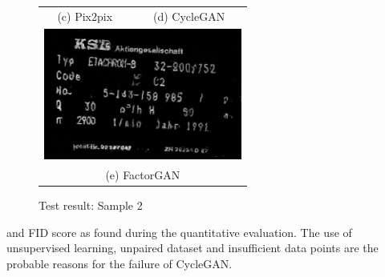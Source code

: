 \begin{figure}[H]
\begin{tabular}{cc}
(c) Pix2pix & (d) CycleGAN \\[6pt]
\multicolumn{2}{c}{\includegraphics[width=65mm]{images/f1.jpg} }\\
\multicolumn{2}{c}{(e) FactorGAN}
\end{tabular}
\caption{Test result: Sample 2}
\label{test2}
\end{figure}
\noindent
and FID score as found during the quantitative evaluation. The use of unsupervised learning, unpaired dataset and insufficient data points are the probable reasons for the failure of CycleGAN.
\newline	

